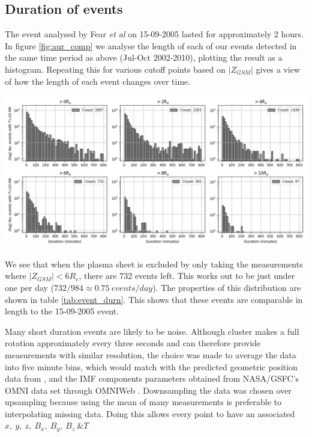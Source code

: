 \documentclass[12pt]{article}
\newenvironment{Figure}
  {\par\medskip\noindent\minipage{\linewidth}}
  {\endminipage\par\medskip}
\begin{document}
\subsection{Duration of events \label{ssec:DURn}}
The event analysed by Fear \textit{et al} \cite{Fear1506} on 15-09-2005 lasted for approximately 2 hours. In figure \ref{fig:aur_comp} we analyse the length of each of our events detected in the same time period as above (Jul-Oct 2002-2010), plotting the result as a histogram. Repeating this for various cutoff points based on $|Z_{GSM}|$ gives a view of how the length of each event changes over time. 

\begin{Figure}
    \centering
    \includegraphics[width=\textwidth]{aur_comp.png}
    \label{fig:aur_comp}
\end{Figure}

We see that when the plasma sheet is excluded by only taking the measurements where $|Z_{GSM}|<6R_e$, there are $732$ events left. This works out to be just under one per day ($732/984\approx0.75\ events/day$). The properties of this distribution are shown in table \ref{tab:event_durn}. This shows that these events are comparable in length to the 15-09-2005 event.

Many short duration events are likely to be noise. Although cluster makes a full rotation approximately every three seconds and can therefore provide measurements with similar resolution, the choice was made to average the data into five minute bins, which would match with the predicted geometric position data from \cite{cdms}, and the IMF components parameters obtained from NASA/GSFC's OMNI data set through OMNIWeb \cite{omniData}. Downsampling the data was chosen over upsampling because using the mean of many measurements is preferable to interpolating missing data. Doing this allows every point to have an associated $x,\ y,\ z,\ B_x,\ B_y,\ B_z\ \& T$
\end{document}

